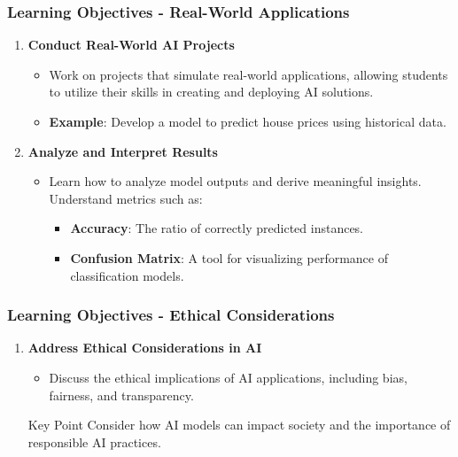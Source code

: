 \documentclass{beamer}
\begin{document}
\begin{frame}
    \frametitle{Learning Objectives - Real-World Applications}
    \begin{enumerate}[resume]
        \item \textbf{Conduct Real-World AI Projects}
        \begin{itemize}
            \item Work on projects that simulate real-world applications, allowing students to utilize their skills in creating and deploying AI solutions.
            \item \textbf{Example}: Develop a model to predict house prices using historical data.
        \end{itemize}

        \item \textbf{Analyze and Interpret Results}
        \begin{itemize}
            \item Learn how to analyze model outputs and derive meaningful insights. Understand metrics such as:
                \begin{itemize}
                    \item \textbf{Accuracy}: The ratio of correctly predicted instances.
                    \item \textbf{Confusion Matrix}: A tool for visualizing performance of classification models.
                \end{itemize}
        \end{itemize}
    \end{enumerate}
\end{frame}

\begin{frame}
    \frametitle{Learning Objectives - Ethical Considerations}
    \begin{enumerate}[resume]
        \item \textbf{Address Ethical Considerations in AI}
        \begin{itemize}
            \item Discuss the ethical implications of AI applications, including bias, fairness, and transparency.
        \end{itemize}
        \begin{block}{Key Point}
            Consider how AI models can impact society and the importance of responsible AI practices.
        \end{block}
    \end{enumerate}
\end{frame}
\end{document}
